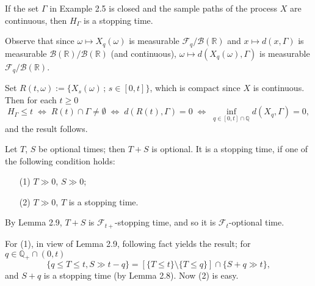 \documentclass{report}
\begin{document}
\setcounter{exe}{6}
\begin{prob} 
	If the set \( \Gamma \) in Example 2.5 is closed and the sample paths of the process \( X \) are continuous, then \( H_{\Gamma} \) is a stopping time.
\end{prob}
\begin{prf}
	Observe that since \( \omega \mapsto X_q(\omega) \) is measurable \( \mathscr{F}_q/\mathscr{B}(\mathbb{R}) \) and \( x \mapsto d(x,\Gamma) \) is measurable \( \mathscr{B}(\mathbb{R})/\mathscr{B}(\mathbb{R}) \) (and continuous),
	\( \omega \mapsto d(X_q(\omega),\Gamma) \) is measurable \( \mathscr{F}_q/\mathscr{B}(\mathbb{R}) \).
	
	Set \( R(t,\omega):=\{X_s(\omega)\,;\,s\in[0,t]\} \), which is compact since \( X \) is continuous.
	Then for each \( t\ge0 \)
	\[H_{\Gamma} \le t \; \Leftrightarrow \; R(t)\cap \Gamma \neq \emptyset
		\;\Leftrightarrow \; d(R(t),\Gamma)=0 \; \Leftrightarrow \; \inf_{q\in [0,t]\cap \mathbb{Q}}d(X_q,\Gamma)=0,\]
	and the result follows.
\end{prf}

\setcounter{exe}{9}
\begin{prob}
	Let \( T \), \( S \) be optional times; then \( T+S \) is optional.
	It is a stopping time, if one of the following condition holds:
	\begin{itemize}
		\item[(1)] \( T\gg 0 \), \( S\gg 0 \);
		\item[(2)] \( T\gg 0 \), \( T \) is a stopping time.
	\end{itemize}
\end{prob}
\begin{prf}
	By Lemma 2.9, \( T+S \) is \( \mathscr{F}_{t+} \)-stopping time, and so it is 
	\( \mathscr{F}_{t} \)-optional time.
	
	For (1), in view of Lemma 2.9, following fact yields the result; 
	for \( q\in \mathbb{Q}_{+}\cap(0,t) \)
	\[
		\{q\le T\le t, S\gg t-q\}=[\{T\le t\} \setminus \{T\le q\}] \cap \{S+q\gg t\},
	\]
	and \( S+q \) is a stopping time (by Lemma 2.8).
	Now (2) is easy.
\end{prf}
\end{document}
